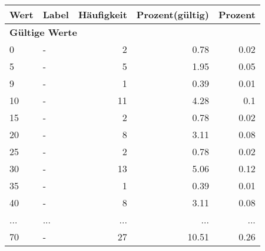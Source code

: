      \begin{longtable}{lXrrr}
     \toprule
     \textbf{Wert} & \textbf{Label} & \textbf{Häufigkeit} & \textbf{Prozent(gültig)} & \textbf{Prozent} \\
     \endhead
     \midrule
     \multicolumn{5}{l}{\textbf{Gültige Werte}}\\
        0 & \multicolumn{1}{X}{-} & %
          \num{2} &
          \num[round-mode=places,round-precision=2]{0,78} &
          \num[round-mode=places,round-precision=2]{0,02} \\
        5 & \multicolumn{1}{X}{-} & %
          \num{5} &
          \num[round-mode=places,round-precision=2]{1,95} &
          \num[round-mode=places,round-precision=2]{0,05} \\
        9 & \multicolumn{1}{X}{-} & %
          \num{1} &
          \num[round-mode=places,round-precision=2]{0,39} &
          \num[round-mode=places,round-precision=2]{0,01} \\
        10 & \multicolumn{1}{X}{-} & %
          \num{11} &
          \num[round-mode=places,round-precision=2]{4,28} &
          \num[round-mode=places,round-precision=2]{0,1} \\
        15 & \multicolumn{1}{X}{-} & %
          \num{2} &
          \num[round-mode=places,round-precision=2]{0,78} &
          \num[round-mode=places,round-precision=2]{0,02} \\
        20 & \multicolumn{1}{X}{-} & %
          \num{8} &
          \num[round-mode=places,round-precision=2]{3,11} &
          \num[round-mode=places,round-precision=2]{0,08} \\
        25 & \multicolumn{1}{X}{-} & %
          \num{2} &
          \num[round-mode=places,round-precision=2]{0,78} &
          \num[round-mode=places,round-precision=2]{0,02} \\
        30 & \multicolumn{1}{X}{-} & %
          \num{13} &
          \num[round-mode=places,round-precision=2]{5,06} &
          \num[round-mode=places,round-precision=2]{0,12} \\
        35 & \multicolumn{1}{X}{-} & %
          \num{1} &
          \num[round-mode=places,round-precision=2]{0,39} &
          \num[round-mode=places,round-precision=2]{0,01} \\
        40 & \multicolumn{1}{X}{-} & %
          \num{8} &
          \num[round-mode=places,round-precision=2]{3,11} &
          \num[round-mode=places,round-precision=2]{0,08} \\
       ... & ... & ... & ... & ... \\
        70 & \multicolumn{1}{X}{-} & %
          \num{27} &
          \num[round-mode=places,round-precision=2]{10,51} &
          \num[round-mode=places,round-precision=2]{0,26} \\


\end{longtable}
